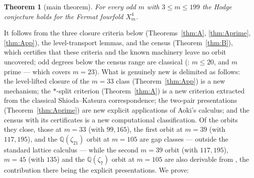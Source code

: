 \documentclass[11pt]{amsart}
\newtheorem{theorem}{Theorem}[section]
\theoremstyle{remark}
\newcommand{\Q}{\mathbb{Q}}
\newcommand{\zt}{\zeta}
\begin{document}
\begin{theorem}[main theorem]\label{thm:main}
For every odd $m$ with $3\le m\le199$ the Hodge conjecture holds for the Fermat fourfold
$X^4_m$.
\end{theorem}
\noindent It follows from the three closure criteria below (Theorems~\ref{thm:A},
\ref{thm:Aprime}, \ref{thm:App}), the level-transport lemmas, and the census
(Theorem~\ref{thm:B}), which certifies that these criteria and the known machinery leave no
orbit uncovered; odd degrees below the census range are classical
(\cite[Thms.~2.6--2.7]{daSilva}: $m\le20$, and $m$ prime --- which covers $m=23$). What is genuinely new is delimited as follows: the
level-lifted closure of the $m=33$ class (Theorem~\ref{thm:App}) is a new mechanism; the
$*$-split criterion (Theorem~\ref{thm:A}) is a new criterion extracted from the classical
Shioda--Katsura correspondence; the two-pair presentations (Theorem~\ref{thm:Aprime}) are new
explicit applications of Aoki's calculus; and the census with its certificates is a new
computational classification. Of the orbits they close, those at $m=33$ (with $99,165$), the
first orbit at $m=39$ (with $117,195$), and the $\Q(\zt_{21})$ orbit at $m=105$ are gap
classes --- outside the standard lattice calculus --- while the second $m=39$ orbit (with $117,195$), $m=45$
(with $135$) and the $\Q(\zt_7)$ orbit at $m=105$ are also derivable from
\cite[Lem.~4.1(iii)]{Aoki00}, the contribution there being the explicit presentations. We prove:
\end{document}
